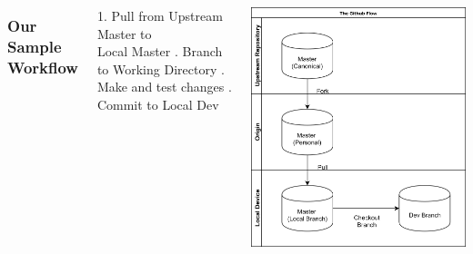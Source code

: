 \documentclass[unknownkeysallowed]{beamer}
\begin{document}
\begin{frame}
    \vspace{1cm}
	\begin{columns}
		\column{2.5in}
    \frametitle{Our Sample Workflow}
        1. Pull from Upstream Master to \\
        Local Master \linebreak{}. Branch to Working Directory \linebreak{}. Make and test changes \linebreak{}. Commit to Local Dev \linebreak\linebreak
	\linebreak\linebreak
	\linebreak\linebreak
	\column{2.25in}
	\begin{center}
	\includegraphics[width = .9\linewidth]{assets/gitflow4}
	\end{center}
	\end{columns}
    \vspace{1cm}
\end{frame}
\end{document}
